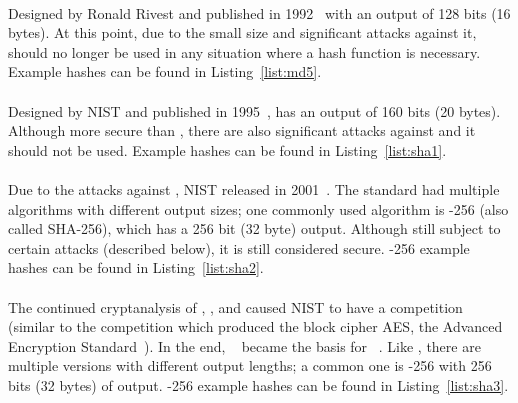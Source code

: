 \paragraph{\MDFive{}} Designed by Ronald Rivest
and published in 1992~\cite{rfc1321} with an output of 128 bits (16 bytes).
At this point, due to the small size and significant attacks against it,
\MDFive{} should no longer be used in any situation
where a \gls{hash function} is necessary.
Example hashes can be found in Listing~\ref{list:md5}.

\paragraph{\ShaOne{}} Designed by NIST and published
in 1995~\cite{FIPS-180-1-1995},
\ShaOne{} has an output of 160 bits (20 bytes).
Although more secure than \MDFive{},
there are also significant attacks against \ShaOne{}
and it should not be used.
Example hashes can be found in Listing~\ref{list:sha1}.

\paragraph{\ShaTwo{}} Due to the attacks against \ShaOne{},
NIST released \ShaTwo{} in 2001~\cite{FIPS-180-4-2015}.
The standard had multiple algorithms with different output sizes;
one commonly used algorithm is \ShaTwo{}-256 (also called SHA-256),
which has a 256 bit (32 byte) output.
Although still subject to certain attacks (described below),
it is still considered secure.
\ShaTwo{}-256 example hashes can be found in Listing~\ref{list:sha2}.

\paragraph{\ShaThree{}}
The continued cryptanalysis of \MDFive{}, \ShaOne{}, and \ShaTwo{}
caused NIST to have a competition
(similar to the competition which produced the block cipher AES,
the Advanced Encryption Standard~\cite{FIPS-197-2001}).
In the end, \Keccak{}~\cite{KeccakSponge2011} became the basis
for \ShaThree{}~\cite{FIPS-202}.
Like \ShaTwo{}, there are multiple versions with different output lengths;
a common one is \ShaThree{}-256 with 256 bits (32 bytes) of output.
\ShaThree{}-256 example hashes can be found in Listing~\ref{list:sha3}.








